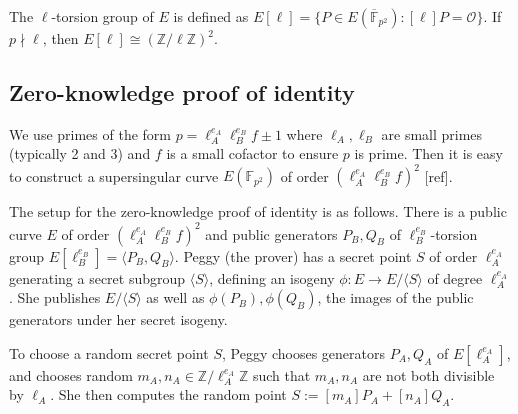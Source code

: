 \documentclass[runningheads,a4paper]{llncs}
\begin{document}
The $\ell$-torsion group of $E$ is defined as $E[\ell] = \{P \in E(\overline{\mathbb{F}}_{p^2}) : [\ell] P = \mathcal{O}\}$. If $p \nmid \ell$, then $E[\ell] \cong (\mathbb{Z}/\ell\mathbb{Z})^2$.

\subsection{Zero-knowledge proof of identity}
We use primes of the form $p = \ell_A^{e_A}\ell_B^{e_B}f \pm 1$ where $\ell_A, \ell_B$ are small primes (typically 2 and 3) and $f$ is a small cofactor to ensure $p$ is prime. Then it is easy to construct a supersingular curve $E(\mathbb{F}_{p^2})$ of order $(\ell_A^{e_A}\ell_B^{e_B}f)^2$ [ref].

The setup for the zero-knowledge proof of identity is as follows. There is a public curve $E$ of order $(\ell_A^{e_A}\ell_B^{e_B}f)^2$ and public generators $P_B, Q_B$ of $\ell_B^{e_B}$-torsion group $E[\ell_B^{e_B}] = \langle P_B,Q_B\rangle$. Peggy (the prover) has a secret point $S$ of order $\ell_A^{e_A}$ generating a secret subgroup $\langle S \rangle$, defining an isogeny $\phi:E \to E/\langle S\rangle$ of degree $\ell_A^{e_A}$. She publishes $E/\langle S \rangle$ as well as $\phi(P_B), \phi(Q_B)$, the images of the public generators under her secret isogeny.

To choose a random secret point $S$, Peggy chooses generators $P_A,Q_A$ of $E[\ell_A^{e_A}]$, and chooses random $m_A,n_A \in \mathbb{Z}/\ell_A^{e_A}\mathbb{Z}$ such that $m_A,n_A$ are not both divisible by $\ell_A$. She then computes the random point $S := [m_A]P_A + [n_A]Q_A$.
\end{document}

